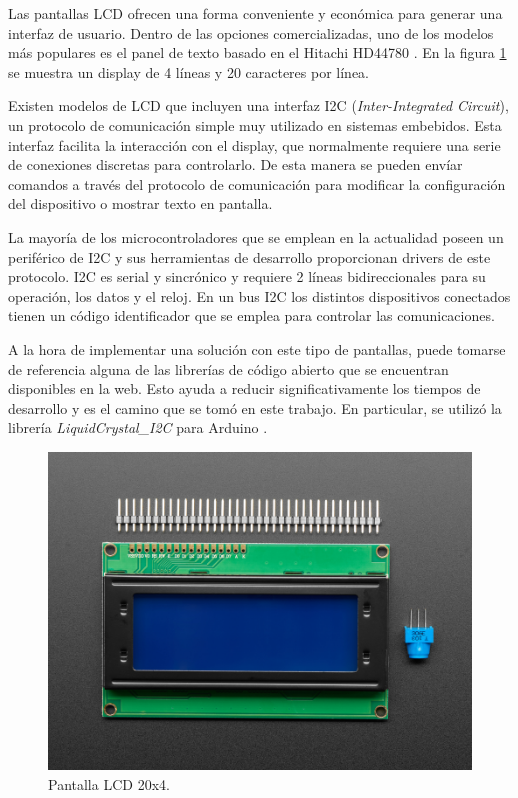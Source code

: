 Las pantallas LCD ofrecen una forma conveniente y económica para generar una interfaz de usuario. Dentro de las opciones comercializadas, uno de los modelos más populares es el panel de texto basado en el Hitachi HD44780 \citep{Arduino_Cookbook}. En la figura \ref{fig:Pantalla_LCD} se muestra un display de 4 líneas y 20 caracteres por línea.

Existen modelos de LCD que incluyen una interfaz I2C (\textit{Inter-Integrated Circuit}), un protocolo de comunicación simple muy utilizado en sistemas embebidos. Esta interfaz facilita la interacción con el display, que normalmente requiere una serie de conexiones discretas para controlarlo. De esta manera se pueden envíar comandos a través del protocolo de comunicación para modificar la configuración del dispositivo o mostrar texto en pantalla.

La mayoría de los microcontroladores que se emplean en la actualidad poseen un periférico de I2C y sus herramientas de desarrollo proporcionan drivers de este protocolo. I2C es serial y sincrónico y requiere 2 líneas bidireccionales para su operación, los datos y el reloj. En un bus I2C los distintos dispositivos conectados tienen un código identificador que se emplea para controlar las comunicaciones.

A la hora de implementar una solución con este tipo de pantallas, puede tomarse de referencia alguna de las librerías de código abierto que se encuentran disponibles en la web. Esto ayuda a reducir significativamente los tiempos de desarrollo y es el camino que se tomó en este trabajo. En particular, se utilizó la librería \textit{LiquidCrystal\_I2C} para Arduino \citep{web_repo_display_i2c}.

\newpage

\begin{figure}[h!]
	\centering
	\includegraphics[scale=1.3]{./Figures/LCD.jpg}
	\caption{Pantalla LCD 20x4\protect\footnotemark .}
	\label{fig:Pantalla_LCD}
\end{figure}

